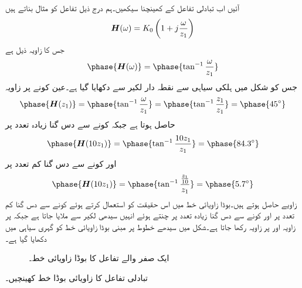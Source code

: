 آئیں اب تبادلی تفاعل کے  کھینچنا سیکھیں۔ہم درج ذیل تفاعل کو مثال بناتے ہیں
\begin{align}
{\ensuremath{{\boldsymbol{H}}}}(\omega)=K_0\left(1+j\frac{\omega}{z_1}\right)
\end{align}
جس کا زاویہ ذیل ہے
\begin{align}
\phase{\bH(\omega)}=\phase{\tan^{-1} \frac{\omega}{z_1}}
\end{align}
 جس کو شکل  میں ہلکی سیاہی سے نقطہ دار لکیر سے دکھایا گیا ہے۔عین کونے   پر زاویہ
\begin{align*}
\phase{\bH(z_1)}=\phase{\tan^{-1}\frac{\omega}{z_1}}=\phase{\tan^{-1} \frac{z_1}{z_1}}=\phase{45^{\circ}}
\end{align*}
حاصل ہوتا ہے جبکہ کونے سے دس گنا زیادہ تعدد  پر 
\begin{align*}
\phase{\bH(10 z_1)}=\phase{\tan^{-1} \frac{10 z_1}{z_1}}=\phase{84.3^{\circ}}
\end{align*}
 اور کونے سے دس گنا کم تعدد  پر 
\begin{align*}
\phase{\bH(10 z_1)}=\phase{\tan^{-1} \frac{\tfrac{z_1}{10}}{z_1}}=\phase{5.7^{\circ}}
\end{align*}
زاویے حاصل ہوتے ہیں۔بوڈا زاویائی خط میں اس حقیقت کو استعمال کرتے ہوئے کونے سے دس گنا کم تعدد  پر  اور کونے سے دس گنا زیادہ تعدد  پر  چنتے ہوئے انہیں سیدھی لکیر سے ملایا جاتا ہے جبکہ  پر زاویہ  اور  پر زاویہ  رکھا جاتا ہے۔شکل  میں سیدھے خطوط پر مبنی بوڈا زاویائی خط کو گہری سیاہی میں دکھایا گیا ہے۔
%
\begin{figure}
\centering
{}
\caption{ایک صفر والے تفاعل کا بوڈا زاویائی خط۔}
\label{شکل_تعددی_زاویائی_بوڈا_ایک_صفر_الف}
\end{figure}
تبادلی تفاعل  کا زاویائی بوڈا خط کھینچیں۔

